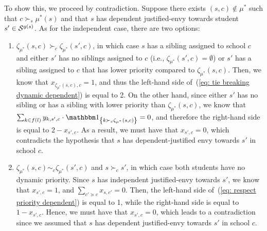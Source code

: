                 To show this, we proceed by contradiction. Suppose there exists \((s,c) \notin \mu^*\) such that \(c \succ_s \mu^*(s)\) and that \(s\) has dependent justified-envy towards student \(s' \in \mathcal{S}^{g(s)}\). As for the independent case, there are two options:
                \begin{enumerate}
                  \item \(\zeta_{\mu^*} (s,c) \succ_c \zeta_{\mu^*} (s',c)\), in which case \(s\) has a sibling assigned to school \(c\) and either \(s'\) has no siblings assigned to \(c\) (i.e., \(\zeta_{\mu^*} (s',c) = \emptyset\)) or \(s'\) has a sibling assigned to \(c\) that has lower priority compared to \(\zeta_{\mu^*} (s,c)\). Then, we know that \(x_{\zeta_{\mu^*} (s,c),c} = 1\), and thus the left-hand side of~(\ref{eq: tie breaking dynamic dependent}) is equal to 2.
                  On the other hand, since either \(s'\) has no sibling or has a sibling with lower priority than \(\zeta_{\mu^*} (s,c)\), we know that \(\sum_{k\in f(l)} y_{k,s',c}\cdot \ind{k \succ_c \zeta_{\mu^*} (s,c)} = 0\), and therefore the right-hand side is equal to \(2-x_{s',c}\). As a result, we must have that \(x_{s',c} = 0\), which contradicts the hypothesis that \(s\) has dependent-justified envy towards \(s'\) in school \(c\).
                  \item \(\zeta_{\mu^*} (s,c) \sim_c \zeta_{\mu^*} (s',c)\) and \(s\succ_c s'\), in which case both students have no dynamic priority.
                  Since \(s\) has independent justified-envy towards \(s'\), we know that \(x_{s',c} = 1\), and \(\sum_{c'\succeq c} x_{s,c'} = 0\). Then, the left-hand side of~(\ref{eq: respect priority dependent}) is equal to 1, while the right-hand side is equal to \(1 - x_{s',c}\). Hence, we must have that \(x_{s',c} = 0\), which leads to a contradiction since we assumed that \(s\) has dependent justified-envy towards \(s'\) in school \(c\).
                \end{enumerate}
            \Halmos\endproof


